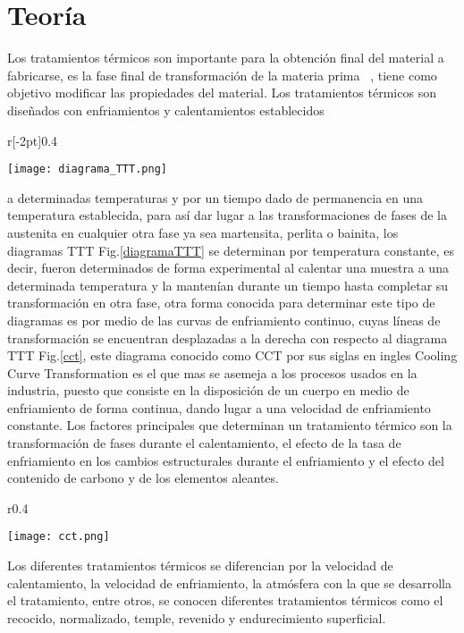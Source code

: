 \documentclass[a4paper, 9pt]{article}
\begin{document}
\section{Teor\'ia}
\setcounter{page}{1}
\captionsetup{font=footnotesize}
\captionsetup[figure]{labelfont=bf,textfont=it}
Los tratamientos térmicos son importante para la obtención final del material a fabricarse, es la fase final de transformación de la materia prima ~\cite{guia}, tiene como objetivo modificar las propiedades del material. Los tratamientos térmicos son diseñados  con enfriamientos y calentamientos establecidos
\begin{wrapfigure}[15]{r}[-2pt]{0.4\textwidth} 
\vspace{-0.8cm}
  \begin{center}
    \texttt{[image: diagrama\_TTT.png]}
	\vspace{-0.4cm}    
    \caption{Diagrama TTT del Acero}
    \label{diagramaTTT}
  \end{center}
\end{wrapfigure} 
 a determinadas temperaturas y por un tiempo dado de permanencia en una temperatura establecida, para así dar lugar a las transformaciones de fases de la austenita en cualquier otra fase ya sea martensita, perlita o bainita, los diagramas TTT Fig.\ref{diagramaTTT} se determinan por temperatura constante, es decir, fueron determinados de forma experimental al calentar una muestra a una determinada temperatura y la mantenían durante un tiempo hasta completar su transformación en otra fase, otra forma conocida para determinar este tipo de diagramas es por medio de las curvas de enfriamiento continuo, cuyas líneas de transformación se encuentran desplazadas a la derecha con respecto al diagrama TTT Fig.\ref{cct}, este diagrama conocido como CCT por sus siglas en ingles Cooling Curve Transformation es el que mas se asemeja a los procesos usados en la industria, puesto que consiste en la disposición de un cuerpo en medio de enfriamiento de forma continua, dando lugar a una velocidad de enfriamiento constante.
\newpage
Los factores principales que determinan un tratamiento térmico son la transformación de fases durante el calentamiento, el efecto de la tasa de enfriamiento en los cambios estructurales durante el enfriamiento y el efecto del contenido de carbono y de los elementos aleantes.
\\
\begin{wrapfigure}[10]{r}{0.4\textwidth} 
\vspace{-1.4cm}
  \begin{center}
    \texttt{[image: cct.png]}%
	\vspace{-0.45cm}    
    \caption{Diagrama CCT del Acero}
    \label{cct}
  \end{center}
\end{wrapfigure} 
Los diferentes tratamientos térmicos se diferencian por la velocidad de calentamiento, la velocidad de enfriamiento, la atmósfera con la que se desarrolla el tratamiento, entre otros, se conocen diferentes tratamientos térmicos como el recocido, normalizado, temple, revenido y endurecimiento superficial.    
\\
\\
\vspace{0.4cm}
\end{document}
